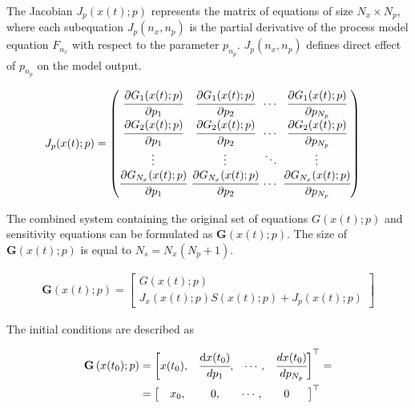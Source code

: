 \documentclass[../Article_Sensitivity_Analsysis.tex]{subfiles}
\begin{document}
	The Jacobian ${J_p}(x(t);p)$ represents the matrix of equations of size $N_x \times N_p$, where each subequation ${J_p}(n_x,n_p)$ is the partial derivative of the process model equation $F_{n_x}$ with respect to the parameter $p_{n_p}$. ${J_p}(n_x,n_p)$ defines direct effect of $p_{n_p}$ on the model output.
	
	{\footnotesize
		\begin{align}
			{J_p}(x(t);p) & =
			\begingroup %
			\setlength\arraycolsep{2pt}
			\begin{pmatrix}
				\cfrac{\partial {G_{1}}(x(t);p)}{\partial {p_{1}}} & \cfrac{\partial {G_{1}}(x(t);p)}{\partial {p_{2}}} & \cdots & \cfrac{\partial {G_{1}}(x(t);p)}{\partial {p_{N_p}}}\\
				\cfrac{\partial {G_{2}}(x(t);p)}{\partial {p_{1}}} & \cfrac{\partial {G_{2}}(x(t);p)}{\partial {p_{2}}} & \cdots & \cfrac{\partial {G_{2}}(x(t);p)}{\partial {p_{N_p}}}\\
				\vdots & \vdots & \ddots & \vdots\\
				\cfrac{\partial {G_{N_x}}(x(t);p)}{\partial {p_{1}}} & \cfrac{\partial {G_{N_x}}(x(t);p)}{\partial {p_{2}}} & \cdots & \cfrac{\partial {G_{N_x}}(x(t);p)}{\partial {p_{N_p}}}
			\end{pmatrix}
			\endgroup
	\end{align}}
	
	The combined system containing the original set of equations ${G}(x(t);p)$ and sensitivity equations can be formulated as ${\textbf{G}}\left(x(t);p\right)$. The size of ${\textbf{G}}\left(x(t);p\right)$ is equal to $N_s = N_x(N_p + 1)$.
	
	{\footnotesize
		\begin{align}
			{\textbf{G}}\left(x(t);p\right) = 
			\begin{bmatrix}
				{G}(x(t);p)\\
				{J_x}(x(t);p)S(x(t);p) + {J_p}(x(t);p)
			\end{bmatrix}
	\end{align} }
	
	The initial conditions are described as
	
	{\footnotesize
		\begin{align}
			{\textbf{G}}\left(x(t_0);p\right)  &= 
			\begin{bmatrix}
                x(t_0),						               &
				\cfrac{ \text{d}x(t_0) }{ d{p_1} },		   &
				\cdots,					 				   &
				\cfrac{ dx(t_0) }{ d{p_{N_p}} }            
			\end{bmatrix}^\top = \\ &=
            \begin{bmatrix} 
                \quad x_0,	                               &
				\quad ~0,		                           &
			    \quad \cdots,			                   &
				\quad 0 \quad~~
			\end{bmatrix}^\top
	\end{align} }
	
\end{document}
